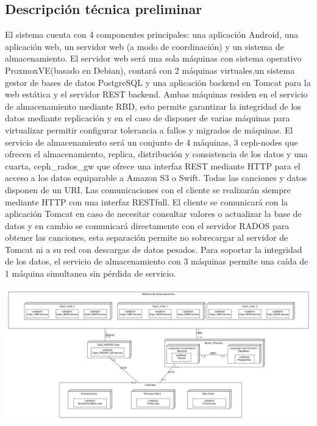 \subsection{Descripci\'on t\'ecnica preliminar}
El sistema cuenta con 4 componentes principales: una aplicaci\'on Android, una aplicaci\'on web, un servidor web (a modo de coordinaci\'on) y un sistema de almacenamiento.
El servidor web ser\'a una sola m\'aquinas con sistema operativo ProxmoxVE(basado en Debian), contar\'a con 2 m\'aquinas virtuales,un sistema gestor de bases de datos PostgreSQL y una aplicaci\'on backend en Tomcat para la web est\'atica y el servidor REST backend. Ambas m\'aquinas residen en el servicio de almacenamiento mediante RBD, esto permite garantizar la integridad de los datos mediante replicaci\'on y en el caso de disponer de varias m\'aquinas para virtualizar permitir configurar tolerancia a fallos y migrados de m\'aquinas.
El servicio de almacenamiento ser\'a un conjunto de 4 m\'aquinas, 3 ceph-nodes que ofrecen el almacenamiento, replica, distribuci\'on y consistencia de los datos y una cuarta, ceph\_rados\_gw que ofrece una interfaz REST mediante HTTP para el acceso a los datos equiparable a Amazon S3 o Swift. Todas las canciones y datos disponen de un URI.
Las comunicaciones con el cliente se realizar\'an siempre mediante HTTP con una interfaz RESTfull. El cliente se comunicar\'a con la aplicaci\'on Tomcat en caso de necesitar consultar valores o actualizar la base de datos y en cambio se comunicar\'a directamente con el servidor RADOS para obtener las canciones, esta separaci\'on permite no sobrecargar al servidor de Tomcat ni a su red con descargas de datos pesados.
Para soportar la integridad de los datos, el servicio de almacenamiento con 3 m\'aquinas permite una ca\'ida de 1 m\'aquina simultanea sin p\'erdida de servicio.

\includegraphics[width=\textwidth]{Figures/deployment.png}